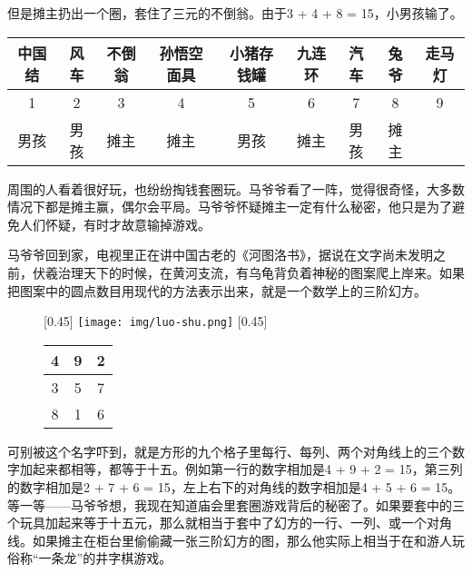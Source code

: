 \documentclass[UTF8]{article}
\begin{document}
但是摊主扔出一个圈，套住了三元的不倒翁。由于3 + 4 + 8 = 15，小男孩输了。

\vspace{5mm}
\begin{adjustbox}{max width=\textwidth}

\begin{tabular}{|c|c|c|c|c|c|c|c|c|}
\hline
中国结 & 风车 & 不倒翁 & 孙悟空面具 & 小猪存钱罐 & 九连环 & 汽车 & 兔爷 & 走马灯 \\
\hline
1 & 2 & 3 & 4 & 5 & 6 & 7 & 8 & 9 \\
\hline
男孩  & 男孩  & 摊主  & 摊主  & 男孩  & 摊主  & 男孩 & 摊主 & \\
\hline
\end{tabular}
\end{adjustbox}
\vspace{5mm}

周围的人看着很好玩，也纷纷掏钱套圈玩。马爷爷看了一阵，觉得很奇怪，大多数情况下都是摊主赢，偶尔会平局。马爷爷怀疑摊主一定有什么秘密，他只是为了避免人们怀疑，有时才故意输掉游戏。

马爷爷回到家，电视里正在讲中国古老的《河图洛书》，据说在文字尚未发明之前，伏羲治理天下的时候，在黄河支流，有乌龟背负着神秘的图案爬上岸来。如果把图案中的圆点数目用现代的方法表示出来，就是一个数学上的三阶幻方。

\begin{figure}[htbp]
 \centering
 [0.45\linewidth]{ \texttt{[image: img/luo-shu.png]}}
 [0.45\linewidth]{
   \begin{tabular}{|c|c|c|}
   \hline
   4 & 9 & 2 \\
   \hline
   3 & 5 & 7 \\
   \hline
   8 & 1 & 6 \\
   \hline
   \end{tabular}
   \vspace{8mm}
 }
 \captionsetup{labelformat=empty}
 \caption{}
 \label{fig:luo-shu}
\end{figure}

可别被这个名字吓到，就是方形的九个格子里每行、每列、两个对角线上的三个数字加起来都相等，都等于十五。例如第一行的数字相加是4 + 9 + 2 = 15，第三列的数字相加是2 + 7 + 6 = 15，左上右下的对角线的数字相加是4 + 5 + 6 = 15。等一等——马爷爷想，我现在知道庙会里套圈游戏背后的秘密了。如果要套中的三个玩具加起来等于十五元，那么就相当于套中了幻方的一行、一列、或一个对角线。如果摊主在柜台里偷偷藏一张三阶幻方的图，那么他实际上相当于在和游人玩俗称“一条龙”的井字棋游戏。
\end{document}
